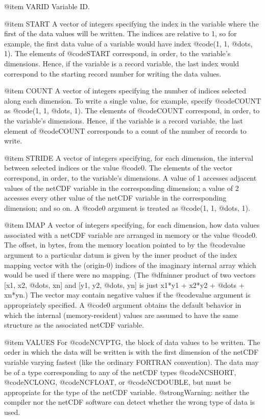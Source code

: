 @item VARID
Variable ID.

@item START
A vector of integers specifying the index in the variable where the
first of the data values will be written.  The indices are relative to
1, so for example, the first data value of a variable would have index
@code{(1, 1, @dots{}, 1)}.  The elements of @code{START} correspond, in
order, to the variable's dimensions.  Hence, if the variable is a record
variable, the last index would correspond to the starting record number
for writing the data values.

@item COUNT
A vector of integers specifying the number of indices selected
along each dimension.
To write a single value, for
example, specify @code{COUNT} as @code{(1, 1, @dots{}, 1)}.  The
elements of @code{COUNT} correspond, in order, to the variable's
dimensions.  Hence, if the variable is a record variable, the last
element of @code{COUNT} corresponds to a count of the number of records
to write.

@item STRIDE
A vector of integers specifying, for each dimension, the interval
between selected indices or the value @code{0}.
The elements of the vector correspond, in order, to the variable's
dimensions.  A value of 1 accesses adjacent values of the netCDF
variable in the corresponding dimension; a value of 2 accesses every
other value of the netCDF variable in the corresponding dimension; and
so on.  A @code{0} argument is treated as @code{(1, 1, @dots{}, 1)}.

@item IMAP
A vector of integers specifying, for each dimension, how data values
associated with a netCDF variable are arranged in memory or the value
@code{0}.  The offset, in bytes, from the memory location pointed to by
the @code{value} argument to a particular datum is given by the inner
product of the index mapping vector with the (origin-0) indices of
the imaginary internal array which would be used if there were no mapping.
(The @dfn{inner product} of two vectors [x1, x2, @dots{},
xn] and [y1, y2, @dots{}, yn] is just x1*y1 + x2*y2 + @dots{} + xn*yn.)
The vector may contain negative values if the @code{value} argument is
appropriately specified.  A @code{0} argument obtains the default
behavior in which the internal (memory-resident) values are assumed to have the
same structure as the associated netCDF variable.

@item VALUES
For @code{NCVPTG}, the block of data values to be written.  The order in
which the data will be written is with the
first dimension of the netCDF variable varying fastest (like the
ordinary FORTRAN convention).
The data may be of a type corresponding to any of the netCDF types
@code{NCSHORT}, @code{NCLONG}, @code{NCFLOAT}, or @code{NCDOUBLE}, but
must be appropriate for the type of the netCDF variable.
@strong{Warning: neither the compiler nor the netCDF software can detect
whether the wrong type of data is used.}

